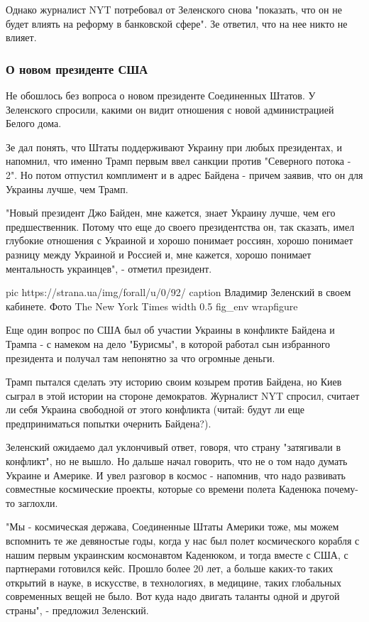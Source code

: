 {Однако журналист NYT потребовал от Зеленского снова "показать, что он не будет
влиять на реформу в банковской сфере". Зе ответил, что на нее никто не влияет.

\subsubsection{О новом президенте США }

Не обошлось без вопроса о новом президенте Соединенных Штатов. У Зеленского
спросили, какими он видит отношения с новой администрацией Белого дома. 

Зе дал понять, что Штаты поддерживают Украину при любых президентах, и
напомнил, что именно Трамп первым ввел санкции против "Северного потока - 2".
Но потом отпустил комплимент и в адрес Байдена - причем заявив, что он для
Украины лучше, чем Трамп.

"Новый президент Джо Байден, мне кажется, знает Украину лучше, чем его
предшественник. Потому что еще до своего президентства он, так сказать, имел
глубокие отношения с Украиной и хорошо понимает россиян, хорошо понимает
разницу между Украиной и Россией и, мне кажется, хорошо понимает ментальность
украинцев", - отметил президент. 

\ifcmt
  pic https://strana.ua/img/forall/u/0/92/%
  caption Владимир Зеленский в своем кабинете. Фото The New York Times
  width 0.5
  fig_env wrapfigure
\fi

Еще один вопрос по США был об участии Украины в конфликте Байдена и Трампа - с
намеком на дело "Бурисмы", в которой работал сын избранного президента и
получал там непонятно за что огромные деньги. 

Трамп пытался сделать эту историю своим козырем против Байдена, но Киев сыграл
в этой истории на стороне демократов. Журналист NYT спросил, считает ли себя
Украина свободной от этого конфликта (читай: будут ли еще предприниматься
попытки очернить Байдена?). 

Зеленский ожидаемо дал уклончивый ответ, говоря, что страну "затягивали в
конфликт", но не вышло. Но дальше начал говорить, что не о том надо думать
Украине и Америке. И увел разговор в космос - напомнив, что надо развивать
совместные космические проекты, которые со времени полета Каденюка почему-то
заглохли. 

"Мы - космическая держава, Соединенные Штаты Америки тоже, мы можем вспомнить
те же девяностые годы, когда у нас был полет космического корабля с нашим
первым украинским космонавтом Каденюком, и тогда вместе с США, с партнерами
готовился кейс. Прошло более 20 лет, а больше каких-то таких открытий в науке,
в искусстве, в технологиях, в медицине, таких глобальных современных вещей не
было. Вот куда надо двигать таланты одной и другой страны", - предложил
Зеленский.

}
